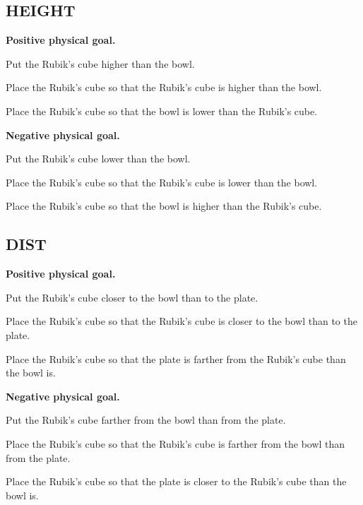 \documentclass[11pt]{article}
\begin{document}
\subsection*{HEIGHT}
\textbf{Positive physical goal.}\par
\begin{description}[font=\normalfont\bfseries]
\item[D] Put the Rubik's cube higher than the bowl.
\item[C] Place the Rubik's cube so that the Rubik's cube is higher than the bowl.
\item[I] Place the Rubik's cube so that the bowl is lower than the Rubik's cube.
\end{description}
\textbf{Negative physical goal.}\par
\begin{description}[font=\normalfont\bfseries]
\item[D] Put the Rubik's cube lower than the bowl.
\item[C] Place the Rubik's cube so that the Rubik's cube is lower than the bowl.
\item[I] Place the Rubik's cube so that the bowl is higher than the Rubik's cube.
\end{description}
\subsection*{DIST}
\textbf{Positive physical goal.}\par
\begin{description}[font=\normalfont\bfseries]
\item[D] Put the Rubik's cube closer to the bowl than to the plate.
\item[C] Place the Rubik's cube so that the Rubik's cube is closer to the bowl than to the plate.
\item[I] Place the Rubik's cube so that the plate is farther from the Rubik's cube than the bowl is.
\end{description}
\textbf{Negative physical goal.}\par
\begin{description}[font=\normalfont\bfseries]
\item[D] Put the Rubik's cube farther from the bowl than from the plate.
\item[C] Place the Rubik's cube so that the Rubik's cube is farther from the bowl than from the plate.
\item[I] Place the Rubik's cube so that the plate is closer to the Rubik's cube than the bowl is.
\end{description}
\end{document}
